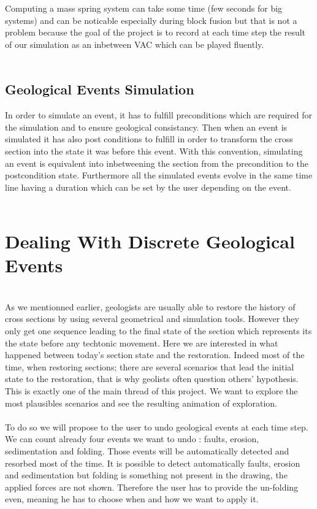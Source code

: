 \documentclass[12pt, a4paper]{report} %
\begin{document}
Computing a mass spring system can take some time (few seconds for big systems) and can be noticable especially during block fusion but that is not a problem because the goal of the project is to record at each time step the result of our simulation as an inbetween VAC which can be played fluently.\\\\

\section{Geological Events Simulation}
In order to simulate an event, it has to fulfill preconditions which are required for the simulation and to ensure geological consistancy. Then when an event is simulated it has also post conditions to fulfill in order to transform the cross section into the state it was before this event. With this convention, simulating an event is equivalent into inbetweening the section from the precondition to the postcondition state. Furthermore all the simulated events evolve in the same time line having a duration which can be set by the user depending on the event.\\\\
\chapter{Dealing With Discrete Geological Events}\\

As we mentionned earlier, geologists are usually able to restore the history of cross sections by using several geometrical and simulation tools. However they only get one sequence leading to the final state of the section which represents its the state before any techtonic movement. Here we are interested in what happened between today's section state and the restoration. Indeed most of the time, when restoring sections; there are several scenarios that lead the initial state to the restoration, that is why geolists often question others' hypothesis. This is exactly one of the main thread of this project. We want to explore the most plausibles scenarios and see the resulting animation of exploration.\\\\
To do so we will propose to the user to undo geological events at each time step. We can count already four events we want to undo : faults, erosion, sedimentation and  folding. Those events will be automatically detected and resorbed most of the time. It is possible to detect automatically faults, erosion and sedimentation but folding is something not present in the drawing, the applied forces are not shown. Therefore the user has to provide the un-folding even, meaning he has to choose when and how we want to apply it.\\\\ 
\end{document}
